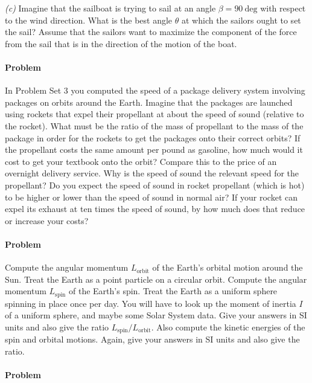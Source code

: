 \documentclass[12pt]{article}
\newcounter{problem}
\begin{document}
\textsl{(c)} Imagine that the sailboat is trying to sail at an angle
$\beta=90~\mathrm{deg}$ with respect to the wind direction.  What is
the best angle $\theta$ at which the sailors ought to set the sail?
Assume that the sailors want to maximize the component of the force
from the sail that is in the direction of the motion of the boat.

\paragraph{Problem~\theproblem}

In Problem Set 3 you computed the speed of a package delivery system
involving packages on orbits around the Earth.  Imagine that the
packages are launched using rockets that expel their propellant at
about the speed of sound (relative to the rocket).  What must be the
ratio of the mass of propellant to the mass of the package in order
for the rockets to get the packages onto their correct orbits?  If the
propellant costs the same amount per pound as gasoline, how much would
it cost to get your textbook onto the orbit?  Compare this to the
price of an overnight delivery service.  Why is the speed of sound the
relevant speed for the propellant?  Do you expect the speed of sound
in rocket propellant (which is hot) to be higher or lower than the
speed of sound in normal air?  If your rocket can expel its exhaust at
ten times the speed of sound, by how much does that reduce or increase
your costs?

\paragraph{Problem~\theproblem}

Compute the angular momentum $L_\mathrm{orbit}$ of the Earth's orbital
motion around the Sun.  Treat the Earth as a point particle on a
circular orbit.  Compute the angular momentum $L_\mathrm{spin}$ of the
Earth's spin.  Treat the Earth as a uniform sphere spinning in place
once per day.  You will have to look up the moment of inertia $I$ of a
uniform sphere, and maybe some Solar System data.  Give your answers
in SI units and also give the ratio
$L_\mathrm{spin}/L_\mathrm{orbit}$.  Also compute the kinetic energies
of the spin and orbital motions.  Again, give your answers in SI units
and also give the ratio.

\paragraph{Problem~\theproblem}
\end{document}
